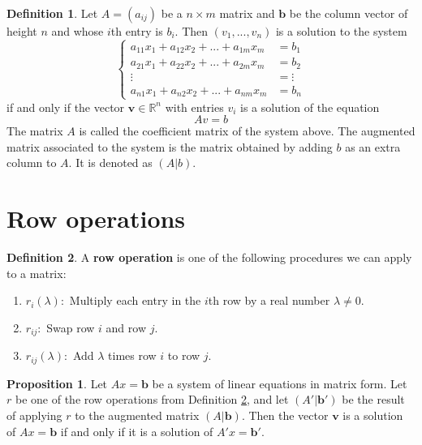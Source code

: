 \documentclass[11pt,a4paper]{article}
\newcommand\R{\mathbb{R}}
\theoremstyle{definition}
\newtheorem{definition}{Definition}
\newtheorem{proposition}{Proposition}
\begin{document}
\begin{definition}
    Let $ A = (a_{ij}) $ be a $ n \times m $ matrix and $\textbf{b}$ be the column vector of height $ n $ and whose $i$th entry is $ b_i $. 
    Then $(v_1, ..., v_n)$ is a solution to the system
    \[
    \begin{cases}
        a_{11}x_1 + a_{12}x_2 + ... + a_{1m}x_m &= b_1 \\
        a_{21}x_1 + a_{22}x_2 + ... + a_{2m}x_m &= b_2 \\
        \vdots                                  &= \vdots \\
        a_{n1}x_1 + a_{n2}x_2 + ... + a_{nm}x_m &= b_n 
    \end{cases}
    \]
    if and only if the vector $\textbf{v} \in \R^n $ with entries $ v_i $ is a solution of the equation
    \[ Av = b\]
    The matrix $ A $ is called the coefficient matrix of the system above. The augmented matrix associated to the system is the matrix obtained by adding $b$ as an extra column to $ A $.
    It is denoted as $ (A|b) $.
\end{definition}

\section{Row operations} 
\begin{definition}
    A \textbf{row operation} is one of the following procedures we can apply to a matrix:
    \begin{enumerate}
        \item $ r_i(\lambda) :$ Multiply each entry in the $i$th row by a real number $ \lambda \neq 0 $.
        \item $ r_{ij} :$ Swap row $i$ and row $j$. 
        \item $ r_{ij}(\lambda) :$ Add $\lambda$ times row $i$ to row $j$. 
    \end{enumerate}
    \label{rowOps}
\end{definition}

\begin{proposition}
    Let $Ax = \textbf{b} $ be a system of linear equations in matrix form. Let $ r $ be one of the row operations from Definition \ref{rowOps}, 
    and let $(A'| \textbf{b}')$ be the result of applying $r$ to the augmented matrix $(A| \textbf{b})$. Then the vector $\textbf{v}$ is a solution of 
    $Ax = \textbf{b} $ if and only if it is a solution of $A'x = \textbf{b}' $.
\end{proposition}
\end{document}
